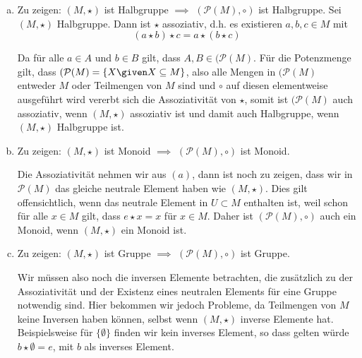 \begin{enumerate}[a)]
  \item Zu zeigen: $(M, \star)$ ist Halbgruppe $\implies$ $(\mathcal{P}(M), \circ)$ ist Halbgruppe.
  Sei $(M, \star)$ Halbgruppe. Dann ist $\star$ assoziativ, d.h. es existieren $a,b,c \in M$ mit
  \[
    (a \star b) \star c = a \star (b \star c)
  \]

  Da für alle $a \in A$ und $b \in B$ gilt, dass $A, B \in (\mathcal{P}(M)$. Für die Potenzmenge gilt, dass $(\mathcal{P}(M) = \{  X \given X \subseteq M \}$, also alle Mengen in $(\mathcal{P}(M)$ entweder $M$ oder Teilmengen von $M$ sind und $\circ$ auf diesen elementweise ausgeführt wird vererbt sich die Assoziativität von $\star$, somit ist $(\mathcal{P}(M)$ auch assoziativ, wenn $(M, \star)$ assoziativ ist und damit auch Halbgruppe, wenn $(M, \star)$ Halbgruppe ist.

  \item Zu zeigen: $(M, \star)$ ist Monoid $\implies$ $(\mathcal{P}(M), \circ)$ ist Monoid.

  Die Assoziativität nehmen wir aus $(a)$, dann ist noch zu zeigen, dass wir in $\mathcal{P}(M)$ das gleiche neutrale Element haben wie $(M, \star)$. Dies gilt offensichtlich, wenn das neutrale Element in $U \subset M$ enthalten ist, weil schon für alle $x \in M$ gilt, dass $e \star x = x$ für $x \in M$. Daher ist $(\mathcal{P}(M), \circ)$ auch ein Monoid, wenn $(M, \star)$ ein Monoid ist.

  \item Zu zeigen: $(M, \star)$ ist Gruppe $\implies$ $(\mathcal{P}(M), \circ)$ ist Gruppe.

  Wir müssen also noch die inversen Elemente betrachten, die zusätzlich zu der Assoziativität und der Existenz eines neutralen Elements für eine Gruppe notwendig sind. Hier bekommen wir jedoch Probleme, da Teilmengen von $M$ keine Inversen haben können, selbst wenn $(M, \star)$ inverse Elemente hat. Beispielsweise für $  \{\emptyset\}  $ finden wir kein inverses Element, so dass gelten würde $b \star \emptyset = e$, mit $b$ als inverses Element.

\end{enumerate}

